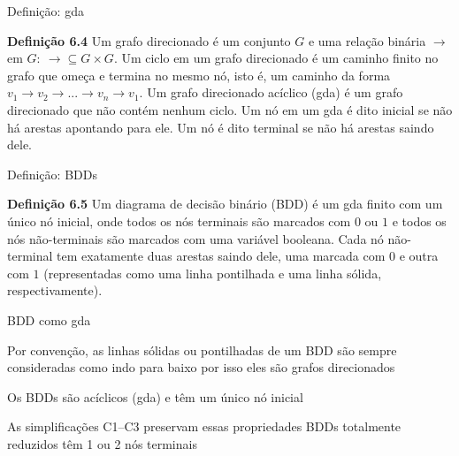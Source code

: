 \expandafter\documentclass\expandafter[table, usenames, svgnames, dvipsnames,14pt, \classopts]{beamer}
\begin{document}
\begin{frame}{Definição: gda}

    \begin{block}{\textbf{Definição 6.4}}
        Um grafo direcionado é um conjunto $\mathit{G}$ e uma relação binária $\rightarrow$ em $\mathit{G}:~\rightarrow \subseteq \mathit{G} \times \mathit{G}$. Um ciclo em um grafo direcionado é um caminho finito no grafo que omeça e termina no mesmo nó, isto é, um caminho da forma $v_1 \rightarrow v_2 \rightarrow ... \rightarrow v_n \rightarrow v_1$. Um grafo direcionado acíclico (gda) é um grafo direcionado que não contém nenhum ciclo. Um nó em um gda é dito inicial se não há arestas apontando para ele. Um nó é dito terminal se não há arestas saindo dele.
    \end{block}

\end{frame}

\begin{frame}{Definição: \uppercase{BDD}s}

    \begin{block}{\textbf{Definição 6.5}}
        Um diagrama de decisão binário (BDD) é um gda finito com um único nó inicial, onde todos os nós terminais são marcados com $0$ ou $1$ e todos os nós não-terminais são marcados com uma variável booleana. Cada nó não-terminal tem exatamente duas arestas saindo dele, uma marcada com $0$ e outra com $1$ (representadas como uma linha pontilhada e uma linha sólida, respectivamente).
    \end{block}

\end{frame}

\begin{frame}{\uppercase{BDD} como gda}

    \begin{outline}
        \1 Por convenção, as linhas sólidas ou pontilhadas de um BDD são sempre consideradas como indo para baixo
            \2[-] por isso eles são grafos direcionados
        
        \vspace{1em}
        
        \1 Os BDDs são acíclicos (gda) e têm um único nó inicial

        \vspace{1em}
        
        \1 As simplificações C1--C3 preservam essas propriedades
            \2[-] BDDs totalmente reduzidos têm 1 ou 2 nós terminais
    \end{outline}

\end{frame}
\end{document}
